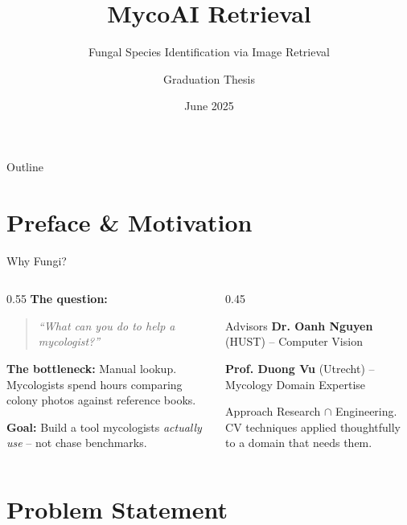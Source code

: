 \documentclass[aspectratio=169]{beamer}
\title{MycoAI Retrieval}
\subtitle{Fungal Species Identification via Image Retrieval}
\author{Graduation Thesis}
\institute{MycoAI Lab -- HUST \& Utrecht}
\date{June 2025}
\begin{document}
\begin{frame}
  \titlepage
\end{frame}

\begin{frame}{Outline}
  \tableofcontents[hideallsubsections]
\end{frame}

\section{Preface \& Motivation}

\begin{frame}{Why Fungi?}
  \begin{columns}[T]
    \begin{column}{0.55\textwidth}
      \textbf{The question:}
      \begin{quote}
        \textit{``What can you do to help a mycologist?''}
      \end{quote}
      \textbf{The bottleneck:} Manual lookup.
      Mycologists spend hours comparing colony photos against reference books.

      \textbf{Goal:} Build a tool mycologists \textit{actually use} -- not chase benchmarks.
    \end{column}
    \begin{column}{0.45\textwidth}
      \begin{block}{Advisors}
        \textbf{Dr. Oanh Nguyen} (HUST) -- Computer Vision

        \textbf{Prof. Duong Vu} (Utrecht) -- Mycology Domain Expertise
      \end{block}
      \begin{exampleblock}{Approach}
        Research $\cap$ Engineering. CV techniques applied thoughtfully to a domain that needs them.
      \end{exampleblock}
    \end{column}
  \end{columns}
\end{frame}

\section{Problem Statement}
\end{document}
